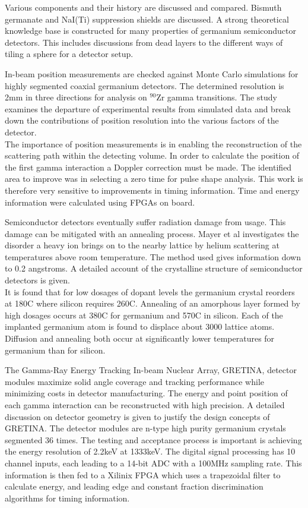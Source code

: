 \documentclass[12pt]{article}
\begin{document}
\begin{doublespacing}
Various components and their history are discussed and compared.
Bismuth germanate and NaI(Ti) suppression shields are discussed.
A strong theoretical knowledge base is constructed for many properties of germanium semiconductor detectors.
This includes discussions from dead layers to the different ways of tiling a sphere for a detector setup.


{\large\textbf{\cite{Descovich2005535}}}
In-beam position measurements are checked against Monte Carlo simulations for highly segmented coaxial germanium detectors.
The determined resolution is 2mm in three directions for analysis on $^{90}\mbox{Zr}$ gamma transitions.
The study examines the departure of experimental results from simulated data and break down the contributions of position resolution into the various factors of the detector.
\\

The importance of position measurements is in enabling the reconstruction of the scattering path within the detecting volume.
In order to calculate the position of the first gamma interaction a Doppler correction must be made.
The identified area to improve was in selecting a zero time for pulse shape analysis.
This work is therefore very sensitive to improvements in timing information.
Time and energy information were calculated using FPGAs on board.


{\large\textbf{\cite{Mayer}}}
Semiconductor detectors eventually suffer radiation damage from usage.
This damage can be mitigated with an annealing process.
Mayer et al investigates the disorder a heavy ion brings on to the nearby lattice by helium scattering at temperatures above room temperature.
The method used gives information down to 0.2 angstroms.
A detailed account of the crystalline structure of semiconductor detectors is given.
\\

It is found that for low dosages of dopant levels the germanium crystal reorders at 180C where silicon requires 260C.
Annealing of an amorphous layer formed by high dosages occurs at 380C for germanium and 570C in silicon.
Each of the implanted germanium atom is found to displace about 3000 lattice atoms.
Diffusion and annealing both occur at significantly lower temperatures for germanium than for silicon.


{\large\textbf{\cite{Paschalis201344}}}
The Gamma-Ray Energy Tracking In-beam Nuclear Array, GRETINA, detector modules maximize solid angle coverage and tracking performance while minimizing costs in detector manufacturing.
The energy and point position of each gamma interaction can be reconstructed with high precision.
A detailed discussion on detector geometry is given to justify the design concepts of GRETINA.
The detector modules are n-type high purity germanium crystals segmented 36 times.
The testing and acceptance process is important is achieving the energy resolution of 2.2keV at 1333keV.
The digital signal processing has 10 channel inputs, each leading to a 14-bit ADC with a 100MHz sampling rate.
This information is then fed to a Xilinix FPGA which uses a trapezoidal filter to calculate energy, and leading edge and constant fraction discrimination algorithms for timing information.



\end{doublespacing}
\end{document}

